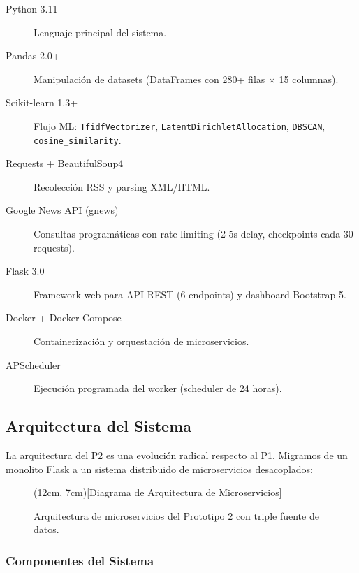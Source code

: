 \begin{description}
    \item[Python 3.11] Lenguaje principal del sistema.
    \item[Pandas 2.0+] Manipulación de datasets (DataFrames con 280+ filas × 15 columnas).
    \item[Scikit-learn 1.3+] Flujo ML: \texttt{TfidfVectorizer}, \texttt{LatentDirichletAllocation}, \texttt{DBSCAN}, \texttt{cosine\_similarity}.
    \item[Requests + BeautifulSoup4] Recolección RSS y parsing XML/HTML.
    \item[Google News API (gnews)] Consultas programáticas con rate limiting (2-5s delay, checkpoints cada 30 requests).
    \item[Flask 3.0] Framework web para API REST (6 endpoints) y dashboard Bootstrap 5.
    \item[Docker + Docker Compose] Containerización y orquestación de microservicios.
    \item[APScheduler] Ejecución programada del worker (scheduler de 24 horas).
\end{description}

\subsection{Arquitectura del Sistema}
\label{subsec:p2_arquitectura}

La arquitectura del P2 es una evolución radical respecto al P1. Migramos de un monolito Flask a un sistema distribuido de microservicios desacoplados:

\begin{figure}[h]
    \centering
    \framebox(12cm, 7cm){[Diagrama de Arquitectura de Microservicios]}
    \caption{Arquitectura de microservicios del Prototipo 2 con triple fuente de datos.}
    \label{fig:arquitectura_p2}
\end{figure}

\subsubsection{Componentes del Sistema}

